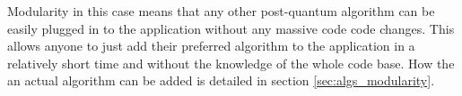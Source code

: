 Modularity in this case means that any other post-quantum algorithm can be easily plugged in to the application without any massive code code changes. This allows anyone to just add their preferred algorithm to the application in a relatively short time and without the knowledge of the whole code base. How the an actual algorithm can be added is detailed in section \ref{sec:algs_modularity}.